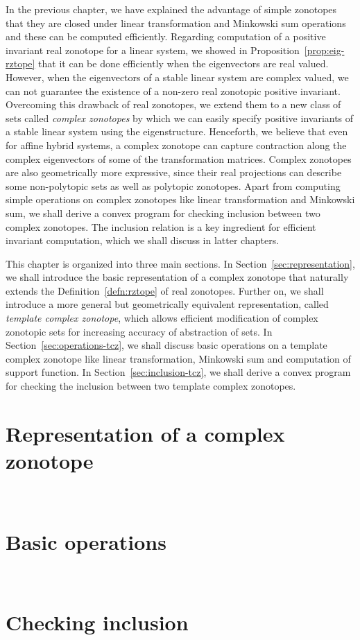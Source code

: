 
In the previous chapter, we have explained the advantage of simple
zonotopes that they are closed under linear transformation and
Minkowski sum operations and these can be computed efficiently.
Regarding computation of a positive invariant real zonotope for a
linear system, we showed in Proposition~\ref{prop:eig-rztope} that it
can be done efficiently when the eigenvectors are real valued.
However, when the eigenvectors of a stable linear system are complex
valued, we can not guarantee the existence of a non-zero real
zonotopic positive invariant.  Overcoming this drawback of real
zonotopes, we extend them to a new class of sets called \emph{complex
zonotopes} by which we can easily specify positive invariants of a
stable linear system using the eigenstructure.  Henceforth, we believe
that even for affine hybrid systems, a complex zonotope can capture
contraction along the complex eigenvectors of some of the
transformation matrices.  Complex zonotopes are also geometrically
more expressive, since their real projections can describe some
non-polytopic sets as well as polytopic zonotopes.  Apart from
computing simple operations on complex zonotopes like linear
transformation and Minkowski sum, we shall derive a convex program for
checking inclusion between two complex zonotopes.  The inclusion
relation is a key ingredient for efficient invariant computation,
which we shall discuss in latter chapters.

This chapter is organized into three main sections.  In
Section~\ref{sec:representation}, we shall introduce the basic
representation of a complex zonotope that naturally extends the
Definition~\ref{defn:rztope} of real zonotopes.  Further on, we shall
introduce a more general but geometrically equivalent representation,
called \emph{template complex zonotope}, which allows efficient
modification of complex zonotopic sets for increasing accuracy of
abstraction of sets.  In Section~\ref{sec:operations-tcz}, we shall
discuss basic operations on a template complex zonotope like linear
transformation, Minkowski sum and computation of support function.  In
Section~\ref{sec:inclusion-tcz}, we shall derive a convex program for
checking the inclusion between two template complex zonotopes.  

\section{Representation of a complex zonotope}~\label{sec:representation}


\section{Basic operations}~\label{sec:operations-tcz}


\section{Checking inclusion}~\label{sec:inclusion-tcz}

